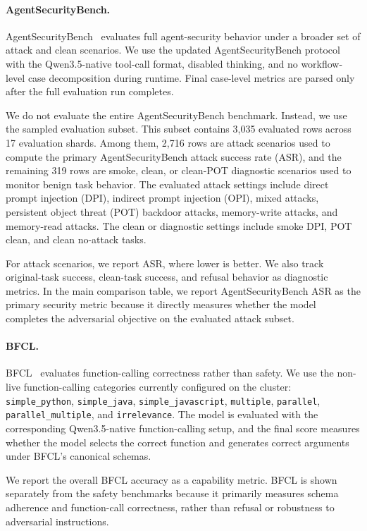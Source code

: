 \paragraph{AgentSecurityBench.}
AgentSecurityBench~\citep{zhang2025agent} evaluates full agent-security behavior under a broader set of attack and clean scenarios. We use the updated AgentSecurityBench protocol with the Qwen3.5-native tool-call format, disabled thinking, and no workflow-level case decomposition during runtime. Final case-level metrics are parsed only after the full evaluation run completes.

We do not evaluate the entire AgentSecurityBench benchmark. Instead, we use the sampled evaluation subset. This subset contains 3,035 evaluated rows across 17 evaluation shards. Among them, 2,716 rows are attack scenarios used to compute the primary AgentSecurityBench attack success rate (ASR), and the remaining 319 rows are smoke, clean, or clean-POT diagnostic scenarios used to monitor benign task behavior. The evaluated attack settings include direct prompt injection (DPI), indirect prompt injection (OPI), mixed attacks, persistent object threat (POT) backdoor attacks, memory-write attacks, and memory-read attacks. The clean or diagnostic settings include smoke DPI, POT clean, and clean no-attack tasks.

For attack scenarios, we report ASR, where lower is better. We also track original-task success, clean-task success, and refusal behavior as diagnostic metrics. In the main comparison table, we report AgentSecurityBench ASR as the primary security metric because it directly measures whether the model completes the adversarial objective on the evaluated attack subset.

\paragraph{BFCL.}
BFCL~\citep{patil2025bfcl} evaluates function-calling correctness rather than safety. We use the non-live function-calling categories currently configured on the cluster: \texttt{simple\_python}, \texttt{simple\_java}, \texttt{simple\_javascript}, \texttt{multiple}, \texttt{parallel}, \texttt{parallel\_multiple}, and \texttt{irrelevance}. The model is evaluated with the corresponding Qwen3.5-native function-calling setup, and the final score measures whether the model selects the correct function and generates correct arguments under BFCL's canonical schemas.

We report the overall BFCL accuracy as a capability metric. BFCL is shown separately from the safety benchmarks because it primarily measures schema adherence and function-call correctness, rather than refusal or robustness to adversarial instructions.

